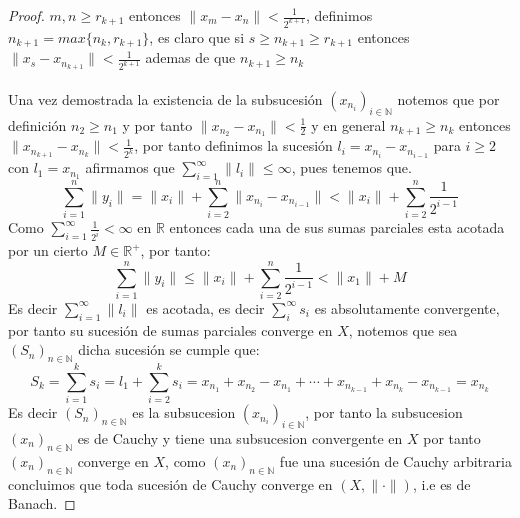 \documentclass[11pt,letterpaper]{article}
\newcommand{\R}{\mathbb{R}}
\newcommand{\N}{\mathbb{N}}
\begin{document}
\begin{proof}
    $m,n\geq r_{k+1}$ entonces $\|x_m-x_n\|< \frac{1}{2^{k+1}}$, definimos $n_{k+1}=max\{n_k,r_{k+1}\}$, es claro que si $s\geq n_{k+1}\geq r_{k+1}$ entonces $\|x_s-x_{n_{k+1}}\|< \frac{1}{2^{k+1}}$ ademas de que $n_{k+1}\geq n_k$\,\\
    \,\\
    Una vez demostrada la existencia de la subsucesi\'on $(x_{n_i})_{i\in \N}$ notemos que por definici\'on $n_2\geq n_1$ y por tanto $\|x_{n_2}-x_{n_1}\|<\frac{1}{2}$ y en general $n_{k+1}\geq n_{k}$ entonces $\|x_{n_{k+1}}-x_{n_k}\|<\frac{1}{2^k}$, por tanto definimos la sucesi\'on $l_i=x_{n_{i}}-x_{n_{i-1}}$ para $i\geq 2$ con $l_1=x_{n_1}$ afirmamos que $\sum_{i=1}^{\infty}\|l_i\|\leq \infty$, pues tenemos que.\,\\
    \begin{equation*}
        \sum_{i=1}^{n}\|y_i\|=\|x_i\|+\sum_{i=2}^n\|x_{n_{i}}-x_{n_{i-1}}\|< \|x_i\|+\sum_{i=2}^n\frac{1}{2^{i-1}}
    \end{equation*}
    Como $\sum_{i=1}^{\infty}\frac{1}{2^i}<\infty$ en $\R$ entonces cada una de sus sumas parciales esta acotada por un cierto $M\in \R^{+}$, por tanto:\,\\
    \begin{equation*}
          \sum_{i=1}^{n}\|y_i\|\leq \|x_i\|+\sum_{i=2}^n\frac{1}{2^{i-1}}< \|x_1\|+M
    \end{equation*}
    Es decir $\sum_{i=1}^{\infty}\|l_i\|$ es acotada, es decir $\sum_{i}^{\infty}s_i$ es absolutamente convergente, por tanto su sucesi\'on de sumas parciales converge en $X$, notemos que sea $(S_n)_{n\in\N}$ dicha sucesi\'on se cumple que:\,\\
    \begin{equation*}
        S_k=\sum_{i=1}^k s_i=l_1+\sum_{i=2}^k s_i=x_{n_1}+x_{n_2}-x_{n_1}+\cdots +x_{n_{k-1}}+x_{n_k}-x_{n_{k-1}}=x_{n_k}
    \end{equation*}
    Es decir $(S_n)_{n\in \N}$ es la subsucesion $(x_{n_i})_{i\in \N}$, por tanto la subsucesion $(x_n)_{n\in \N}$ es de Cauchy y tiene una subsucesion convergente en $X$ por tanto $(x_n)_{n\in \N}$ converge en $X$, como $(x_n)_{n\in \N}$ fue una sucesi\'on de Cauchy arbitraria concluimos que toda sucesi\'on de Cauchy converge en $(X,\|\cdot\|)$, i.e es de Banach. 
\end{proof}
\end{document}
